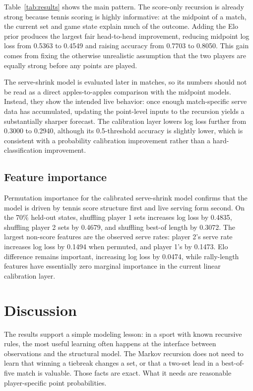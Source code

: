 \documentclass{article} %
\begin{document}
Table~\ref{tab:results} shows the main pattern. The score-only recursion is
already strong because tennis scoring is highly informative: at the midpoint of
a match, the current set and game state explain much of the outcome. Adding the
Elo prior produces the largest fair head-to-head improvement, reducing midpoint
log loss from 0.5363 to 0.4549 and raising accuracy from 0.7703 to 0.8050. This
gain comes from fixing the otherwise unrealistic assumption that the two players
are equally strong before any points are played.

The serve-shrink model is evaluated later in matches, so its numbers should not
be read as a direct apples-to-apples comparison with the midpoint models.
Instead, they show the intended live behavior: once enough match-specific serve
data has accumulated, updating the point-level inputs to the recursion yields a
substantially sharper forecast. The calibration layer lowers log loss further
from 0.3000 to 0.2940, although its 0.5-threshold accuracy is slightly lower,
which is consistent with a probability calibration improvement rather than a
hard-classification improvement.

\subsection{Feature importance}

Permutation importance for the calibrated serve-shrink model confirms that the
model is driven by tennis score structure first and live serving form second.
On the 70\% held-out states, shuffling player 1 sets increases log loss by
0.4835, shuffling player 2 sets by 0.4679, and shuffling best-of length by
0.3072. The largest non-score features are the observed serve rates:
player 2's serve rate increases log loss by 0.1494 when permuted, and player
1's by 0.1473. Elo difference remains important, increasing log loss by 0.0474,
while rally-length features have essentially zero marginal importance in the
current linear calibration layer.

\section{Discussion}

The results support a simple modeling lesson: in a sport with known recursive
rules, the most useful learning often happens at the interface between
observations and the structural model. The Markov recursion does not need to
learn that winning a tiebreak changes a set, or that a two-set lead in a
best-of-five match is valuable. Those facts are exact. What it needs are
reasonable player-specific point probabilities.
\end{document}
